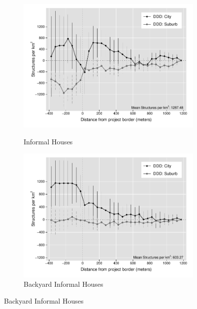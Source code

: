 \documentclass[12pt]{article}
\begin{document}
\begin{figure}[t!]
\begin{subfigure}[b]{0.49\textwidth}
        \label{fig:DDDformal_het}
    \end{subfigure}
    \vskip 1mm \vskip 0pt
    \begin{subfigure}[b]{0.49\textwidth}
        \centering
        \caption[]{\small Informal Houses}
        \vspace{-1mm}
        \includegraphics[width=\textwidth,trim={.5cm .3cm .3cm 0cm}, clip=true]{figures/distplotDDD_bblu_inf_admin_het}
        \label{fig:DDDinformal_het}
    \end{subfigure}
    \hfill
    \begin{subfigure}[b]{0.49\textwidth}  
        \centering
        \caption[]{\small Backyard Informal Houses}  
        \vspace{-1mm}
        \includegraphics[width=\textwidth,trim={.5cm .3cm .3cm 0cm}, clip=true]{figures/distplotDDD_bblu_inf_backyard_admin_het}

\end{subfigure}
\end{figure}
\end{document}
